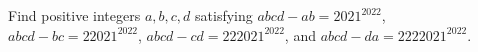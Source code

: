 Find positive integers $a,b,c,d$ satisfying $abcd-ab=2021^{2022}$, $abcd-bc=22021^{2022}$, $abcd-cd=222021^{2022}$, and $abcd-da=2222021^{2022}$.
